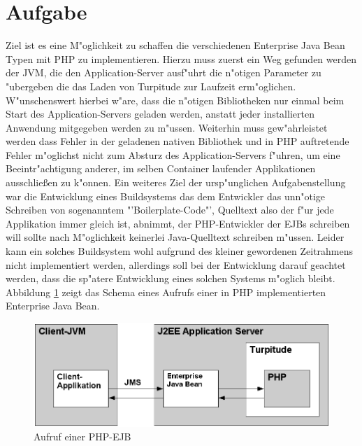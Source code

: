 \section{Aufgabe}
\label{sec:chap2:task}

Ziel ist es eine M"oglichkeit zu schaffen die verschiedenen Enterprise Java Bean Typen mit 
PHP zu implementieren. Hierzu muss zuerst ein Weg gefunden werden der JVM, die den Application-Server 
ausf"uhrt die n"otigen Parameter zu "ubergeben die das Laden von Turpitude zur Laufzeit erm"oglichen.
W"unschenswert hierbei w"are, dass die n"otigen Bibliotheken nur einmal beim Start des Application-Servers
geladen werden, anstatt jeder installierten Anwendung mitgegeben werden zu m"ussen. Weiterhin muss gew"ahrleistet
werden dass Fehler in der geladenen nativen Bibliothek und in PHP auftretende Fehler m"oglichst nicht zum Absturz des
Application-Servers f"uhren, um eine Beeintr"achtigung anderer, im selben Container laufender Applikationen ausschlie\ss en 
zu k"onnen. Ein weiteres Ziel der ursp"unglichen Aufgabenstellung war die Entwicklung eines Buildsystems das dem
Entwickler das unn"otige Schreiben von sogenanntem "'Boilerplate-Code"', Quelltext also der f"ur jede
Applikation immer gleich ist, abnimmt, der PHP-Entwickler der EJBs schreiben will sollte nach M"oglichkeit
keinerlei Java-Quelltext schreiben m"ussen. Leider kann ein solches Buildsystem wohl aufgrund des kleiner
gewordenen Zeitrahmens nicht implementiert werden, allerdings soll bei der Entwicklung darauf geachtet werden,
dass die sp"atere Entwicklung eines solchen Systems m"oglich bleibt.
Abbildung \ref{fig:phpejb} zeigt das Schema eines Aufrufs einer in PHP implementierten Enterprise Java Bean.

\begin{figure}[h]
\includegraphics[width=\textwidth]{chap2/img/phpejb.png}
\caption{Aufruf einer PHP-EJB}
\label{fig:phpejb}
\end{figure}

